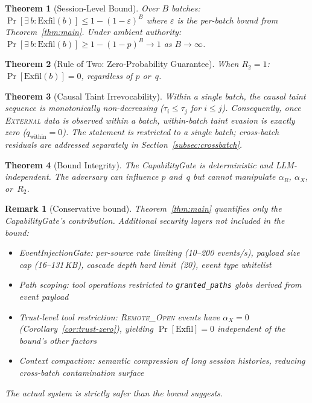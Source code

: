 \documentclass[pdflatex,sn-nature]{sn-jnl}%
\theoremstyle{thmstyleone}%
\newtheorem{theorem}{Theorem}%
\theoremstyle{thmstyletwo}%
\newtheorem{remark}{Remark}%
\theoremstyle{thmstylethree}%
\begin{document}
\begin{theorem}[Session-Level Bound]\label{thm:session}
Over $B$ batches: $\Pr[\exists\, b : \text{Exfil}(b)] \leq 1 - (1-\varepsilon)^B$ where $\varepsilon$ is the per-batch bound from Theorem~\ref{thm:main}. Under ambient authority: $\Pr[\exists\, b : \text{Exfil}(b)] \geq 1-(1-p)^B \to 1$ as $B \to \infty$.
\end{theorem}

\begin{theorem}[Rule of Two: Zero-Probability Guarantee]\label{thm:r2}
When $R_2 = 1$: $\Pr[\text{Exfil}(b)] = 0$, regardless of $p$ or~$q$.
\end{theorem}

\begin{theorem}[Causal Taint Irrevocability]\label{thm:taint}
Within a single batch, the causal taint sequence is monotonically non-decreasing ($\tau_i \leq \tau_j$ for $i \leq j$). Consequently, once \textsc{External} data is observed within a batch, within-batch taint evasion is exactly zero ($q_{\text{within}} = 0$). The statement is restricted to a single batch; cross-batch residuals are addressed separately in Section~\ref{subsec:crossbatch}.
\end{theorem}

\begin{theorem}[Bound Integrity]\label{thm:integrity}
The CapabilityGate is deterministic and LLM-independent. The adversary can influence $p$ and~$q$ but cannot manipulate $\alpha_R$, $\alpha_X$, or~$R_2$.
\end{theorem}

\begin{remark}[Conservative bound]
Theorem~\ref{thm:main} quantifies only the CapabilityGate's contribution. Additional security layers not included in the bound:
\begin{itemize}
  \item EventInjectionGate: per-source rate limiting (10--200 events/s), payload size cap (16--131\,KB), cascade depth hard limit~(20), event type whitelist
  \item Path scoping: tool operations restricted to \texttt{granted\_paths} globs derived from event payload
  \item Trust-level tool restriction: \textsc{Remote\_Open} events have $\alpha_X = 0$ (Corollary~\ref{cor:trust-zero}), yielding $\Pr[\text{Exfil}] = 0$ independent of the bound's other factors
  \item Context compaction: semantic compression of long session histories, reducing cross-batch contamination surface
\end{itemize}
The actual system is strictly safer than the bound suggests.
\end{remark}
\end{document}
